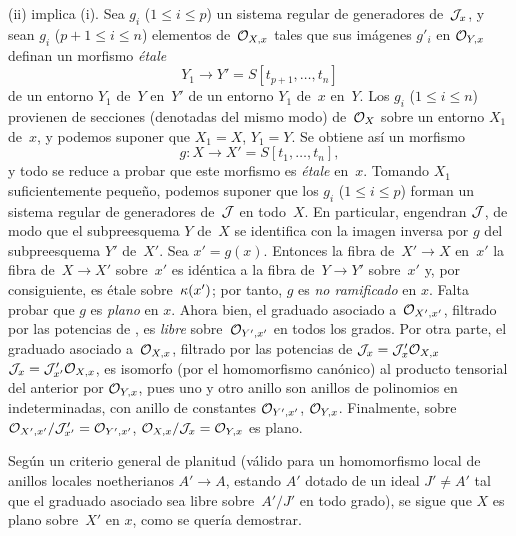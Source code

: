 (ii) implica (i). Sea $g_i$ ($1\leq i\leq p$) un sistema regular de generadores de~$\cal{J}_x$, y sean $g_i$ ($p+1\leq i\leq n$) elementos de~$\cal{O}_{X,x}$ tales que sus imágenes $g'_i$ en $\cal{O}_{Y,x}$ definan un morfismo \emph{étale}
\[
Y_1\to Y'=S[t_{p+1},\dots,t_n]
\]
{de un entorno $Y_1$ de~$Y$ en~$Y'$}
{de un entorno $Y_1$ de~$x$ en~$Y$}.
Los $g_i$ ($1\leq i\leq n$) provienen de secciones (denotadas del mismo modo) de~$\cal{O}_X$ sobre un entorno $X_1$ de~$x$, y podemos suponer que $X_1=X$, $Y_1=Y$. Se obtiene así un morfismo
\[
g\colon X\to X'=S[t_1,\dots,t_n],
\]
y todo se reduce a probar que este morfismo es \emph{étale} en~$x$. Tomando $X_1$ suficientemente pequeño,
podemos suponer que los $g_i$ ($1\leq i\leq p$) forman un sistema regular de generadores de~$\cal{J}$ en todo~$X$. En particular, engendran $\cal{J}$, de modo que el subpreesquema $Y$ de~$X$ se identifica con la imagen inversa por $g$ del subpreesquema $Y'$ de~$X'$. Sea $x'=g(x)$. Entonces
{la fibra de~$X'\to X$ en~$x'$}
{la fibra de~$X\to X'$ sobre~$x'$}
es
idéntica a la fibra de~$Y\to Y'$ sobre~$x'$ y, por consiguiente, es étale sobre~$\kres(x')$; por tanto, $g$ es \emph{no ramificado} en $x$. Falta probar que $g$ es \emph{plano} en $x$. Ahora bien, el graduado asociado a~$\cal{O}_{X',x'}$, filtrado por las potencias de
,
es \emph{libre} sobre~$\cal{O}_{Y',x'}$ en todos los grados. Por otra parte, el graduado asociado a~$\cal{O}_{X,x}$, filtrado por las potencias de
{$\cal{J}_x=\cal{J}'_x\cal{O}_{X,x}$}
{$\cal{J}_x=\cal{J}'_{x'}\cal{O}_{X,x}$},
es isomorfo (por el homomorfismo canónico) al producto tensorial del anterior por $\cal{O}_{Y,x}$, pues uno y otro anillo son anillos de polinomios en
indeterminadas, con anillo de constantes $\cal{O}_{Y',x'}$, \resp $\cal{O}_{Y,x}$. Finalmente, sobre $\cal{O}_{X',x'}/\cal{J}'_{x'}=\cal{O}_{Y',x'}$, $\cal{O}_{X,x}/\cal{J}_x=\cal{O}_{Y,x}$ es plano.

Según un criterio general de planitud (válido para un homomorfismo local de anillos locales noetherianos $A'\to A$, estando $A'$ dotado de un ideal $J'\neq A'$ tal que el graduado asociado sea libre sobre~$A'/J'$ en todo grado), se sigue que $X$ es plano sobre~$X'$ en $x$, como se quería demostrar.


